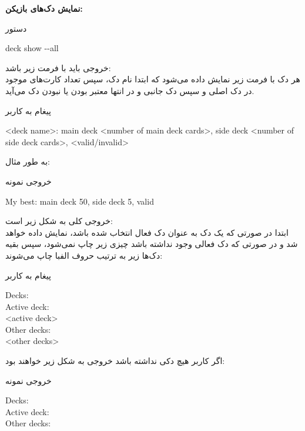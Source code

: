 \documentclass[]{article}
\begin{document}
\textbf{نمایش دک‌های بازیکن:}
\begin{mybox}[colback=yellow]{دستور}
	\begin{latin}	
		deck show -{}-all
	\end{latin}
\end{mybox}
خروجی باید با فرمت زیر باشد:
\\
هر دک با فرمت زیر نمایش داده می‌شود که ابتدا نام دک، سپس تعداد کارت‌های موجود 
در دک اصلی و سپس دک جانبی و در انتها معتبر بودن یا نبودن دک می‌آید.
\begin{mybox}[colback=yellow]{پیغام به کاربر}
	\begin{latin}	
		<deck name>: main deck <number of main deck cards>, side deck <number 
		of side deck cards>, <valid/invalid>
	\end{latin}
\end{mybox}
به طور مثال:
\begin{mybox}[colback=yellow]{خروجی نمونه}
	\begin{latin}	
		My best: main deck 50, side deck 5, valid
	\end{latin}
\end{mybox}
خروجی کلی به شکل زیر است:
\\
ابتدا در صورتی که یک دک به عنوان دک فعال انتخاب شده باشد، نمایش داده خواهد 
شد و در صورتی که دک فعالی وجود نداشته باشد چیزی زیر  چاپ نمی‌شود، 
سپس بقیه دک‌ها زیر  به ترتیب حروف الفبا چاپ می‌شوند:
\begin{mybox}[colback=yellow]{پیغام به کاربر}
	\begin{latin}	
		Decks: \\
		Active deck: \\
		<active deck> \\
		Other decks: \\
		<other decks>
	\end{latin}
\end{mybox}
اگر کاربر هیچ دکی نداشته باشد خروجی به شکل زیر خواهند بود:
\begin{mybox}[colback=yellow]{خروجی نمونه}
	\begin{latin}	
		Decks: \\
		Active deck: \\
		Other decks:
	\end{latin}
\end{mybox}
\end{document}
